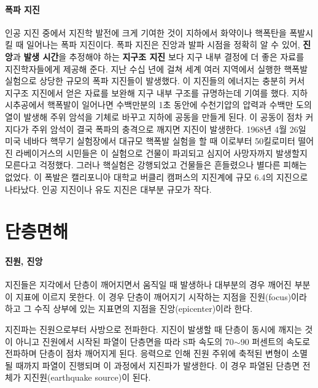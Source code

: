 \documentclass[12pt, a4paper, oneside]{book}
\begin{document}
		\paragraph{폭파 지진}
		인공 지진 중에서 지진학 발전에 크게 기여한 것이 
		지하에서 화약이나 핵폭탄을 폭발시킬 때 일어나는 폭파 지진이다.
		폭파 지진은 진앙과 발파 시점을 정확히 알 수 있어, 
		\textbf{진앙}과 \textbf{발생 시간}을 추정해야 하는 \textbf{지구조 지진} 보다 
		지구 내부 결정에 더 좋은 자료를 지진학자들에게 제공해 준다.
		지난 수십 년에  걸쳐 세계 여러 지역에서 실행한 핵폭발 실험으로 상당한 규모의 폭파 지진들이 발생했다.
		이 지진들의 에너지는 충분히 커서 지구조 지진에서 얻은 자료를 보완해 지구 내부 구조를 규명하는데 기여를 했다.
		지하 시추공에서 핵폭발이 일어나면 수백만분의 1초 동안에 수천기압의 압력과 수백만 도의 열이 발생해 주위 암석을 기체로 바꾸고 지하에 공동을 만들게 된다. 이 공동이 점차 커지다가 주위 암석이 결국 폭파의 충격으로 깨지면 지진이 발생한다.
		1968년 4월 26일 미국 네바다 핵무기 실험장에서 대규모 핵폭발 실험을 할 때 이로부터 50킬로미터 떨어진 라베이거스의 시민들은 이 실험으로 건물이 파괴되고 심지어 사망자까지 발생할지 모른다고 걱정했다.
		그러나 핵실험은 강행되었고 건물들은 흔들렸으나 별다른 피해는 없었다.
		이 폭발은 캘리포니아 대학교 버클리 캠퍼스의 지진계에 규모 6.4의 지진으로 나타났다.
		인공 지진이나 유도 지진은 대부분 규모가 작다.



	\clearpage
	\section{단층면해}
		
		\paragraph{진원, 진앙}
		지진들은 지각에서 단층이 깨어지면서 움직일 때 발생하나 대부분의 경우 깨어진 부분이 지표에 이르지 못한다.
		이 경우 단층이 깨어지기 시작하는 지점을 진원(focus)이라 하고 
		그 수직 상부에 있는 지표면의 지점을 진앙(epicenter)이라 한다.
		
		지진파는 진원으로부터 사방으로 전파한다.
		지진이 발생할 때 단층이 동시에 깨지는 것이 아니고 진원에서 시작된 파열이 단층면을 따라 S파 속도의 70$\sim$90 퍼센트의 속도로 전파하며 단층이 점차 깨어지게 된다.
		응력으로 인해 진원 주위에 축적된 변형이 소멸될 때까지 파열이 진행되며 이 과정에서 지진파가 발생한다.
		이 경우 파열된 단층면 전체가 지진원(earthquake source)이 된다.
		
\end{document}
